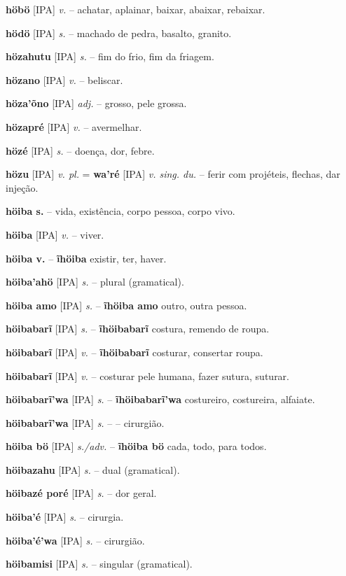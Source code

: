 \textbf{höbö} [IPA] \textit{v.} -- achatar, aplainar, baixar, abaixar, rebaixar.

\textbf{hödö} [IPA] \textit{s.} -- machado de pedra, basalto, granito.

\textbf{hözahutu} [IPA] \textit{s.} -- fim do frio, fim da friagem.

\textbf{hözano} [IPA] \textit{v.} -- beliscar.

\textbf{höza'õno} [IPA] \textit{adj.} -- grosso, pele grossa.

\textbf{hözapré} [IPA] \textit{v.} -- avermelhar.

\textbf{hözé} [IPA] \textit{s.} -- doença, dor, febre.

\textbf{hözu} [IPA] \textit{v. pl.} = \textbf{wa'ré} [IPA] \textit{v. sing. du.} -- ferir com projéteis, flechas, dar injeção.

\textbf{höiba s.} -- vida, existência, corpo pessoa, corpo vivo.

\textbf{höiba} [IPA] \textit{v.} -- viver.

\textbf{höiba v.} -- \textbf{ĩhöiba} existir, ter, haver.

\textbf{höiba'ahö} [IPA] \textit{s.} -- plural (gramatical).

\textbf{höiba amo} [IPA] \textit{s.} -- \textbf{ĩhöiba amo} outro, outra pessoa.

\textbf{höibabarĩ} [IPA] \textit{s.} -- \textbf{ĩhöibabarĩ} costura, remendo de roupa.

\textbf{höibabarĩ} [IPA] \textit{v.} -- \textbf{ĩhöibabarĩ} costurar, consertar roupa.

\textbf{höibabarĩ} [IPA] \textit{v.} -- costurar pele humana, fazer sutura, suturar.

\textbf{höibabarĩ'wa} [IPA] \textit{s.} -- \textbf{ĩhöibabarĩ'wa} costureiro, costureira, alfaiate.

\textbf{höibabarĩ'wa} [IPA] \textit{s.} -- -- cirurgião.

\textbf{höiba bö} [IPA] \textit{s./adv.} -- \textbf{ĩhöiba bö} cada, todo, para todos.

\textbf{höibazahu} [IPA] \textit{s.} -- dual (gramatical).

\textbf{höibazé poré} [IPA] \textit{s.} -- dor geral.

\textbf{höiba'é} [IPA] \textit{s.} -- cirurgia.

\textbf{höiba'é'wa} [IPA] \textit{s.} -- cirurgião.

\textbf{höibamisi} [IPA] \textit{s.} -- singular (gramatical).

